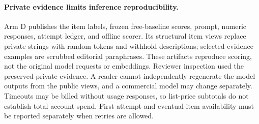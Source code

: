 \paragraph{Private evidence limits inference reproducibility.}
Arm D publishes the item labels, frozen free-baseline scores, prompt, numeric
responses, attempt ledger, and offline scorer. Its structural item views replace
private strings with random tokens and withhold descriptions; selected evidence
examples are scrubbed editorial paraphrases. These artifacts reproduce scoring,
not the original model requests or embeddings. Reviewer inspection used the
preserved private evidence. A reader cannot independently regenerate the model
outputs from the public views, and a commercial model may change separately.
Timeouts may be billed without usage responses, so list-price subtotals do not
establish total account spend. First-attempt and eventual-item availability
must be reported separately when retries are allowed.
